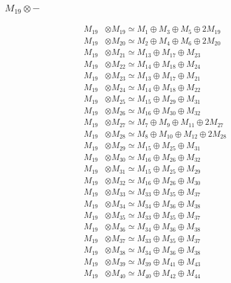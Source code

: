 \subsubsection{$ M_{19}\otimes -$}
\begin{align*}
M_{19} &\otimes M_{19} \simeq M_{1} \oplus M_{3} \oplus M_{5} \oplus 2M_{19} \\
M_{19} &\otimes M_{20} \simeq M_{2} \oplus M_{4} \oplus M_{6} \oplus 2M_{20} \\
M_{19} &\otimes M_{21} \simeq M_{13} \oplus M_{17} \oplus M_{23} \\
M_{19} &\otimes M_{22} \simeq M_{14} \oplus M_{18} \oplus M_{24} \\
M_{19} &\otimes M_{23} \simeq M_{13} \oplus M_{17} \oplus M_{21} \\
M_{19} &\otimes M_{24} \simeq M_{14} \oplus M_{18} \oplus M_{22} \\
M_{19} &\otimes M_{25} \simeq M_{15} \oplus M_{29} \oplus M_{31} \\
M_{19} &\otimes M_{26} \simeq M_{16} \oplus M_{30} \oplus M_{32} \\
M_{19} &\otimes M_{27} \simeq M_{7} \oplus M_{9} \oplus M_{11} \oplus 2M_{27} \\
M_{19} &\otimes M_{28} \simeq M_{8} \oplus M_{10} \oplus M_{12} \oplus 2M_{28} \\
M_{19} &\otimes M_{29} \simeq M_{15} \oplus M_{25} \oplus M_{31} \\
M_{19} &\otimes M_{30} \simeq M_{16} \oplus M_{26} \oplus M_{32} \\
M_{19} &\otimes M_{31} \simeq M_{15} \oplus M_{25} \oplus M_{29} \\
M_{19} &\otimes M_{32} \simeq M_{16} \oplus M_{26} \oplus M_{30} \\
M_{19} &\otimes M_{33} \simeq M_{33} \oplus M_{35} \oplus M_{37} \\
M_{19} &\otimes M_{34} \simeq M_{34} \oplus M_{36} \oplus M_{38} \\
M_{19} &\otimes M_{35} \simeq M_{33} \oplus M_{35} \oplus M_{37} \\
M_{19} &\otimes M_{36} \simeq M_{34} \oplus M_{36} \oplus M_{38} \\
M_{19} &\otimes M_{37} \simeq M_{33} \oplus M_{35} \oplus M_{37} \\
M_{19} &\otimes M_{38} \simeq M_{34} \oplus M_{36} \oplus M_{38} \\
M_{19} &\otimes M_{39} \simeq M_{39} \oplus M_{41} \oplus M_{43} \\
M_{19} &\otimes M_{40} \simeq M_{40} \oplus M_{42} \oplus M_{44} \\

\end{align*}
